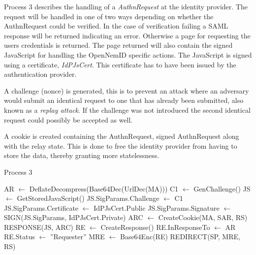\documentclass[twosided]{report}
\begin{document}
Process 3 describes the handling of a \emph{AuthnRequest} at the identity provider. The request will be handled in one of two ways depending on whether the AuthnRequest could be verified. In the case of verification failing a SAML response will be returned indicating an error. Otherwise a page for requesting the users credentials is returned. The page returned will also contain the signed JavaScript for handling the OpenNemID specific actions. The JavaScript is signed using a certificate, \emph{IdPJsCert}. This certificate has to have been issued by the authentication provider.
\par
A challenge (nonce) is generated, this is to prevent an attack where an adversary would submit an identical request to one that has already been submitted, also known as a \emph{replay attack}. If the challenge was not introduced the second identical request could possibly be accepted as well.
\par
A cookie is created containing the AuthnRequest, signed AuthnRequest along with the relay state. This is done to free the identity provider from having to store the data, thereby granting more statelessness.
\begin{algorithm}[H]
	\caption{Process 3}
	\begin{algorithmic}
		\STATE AR $\leftarrow$ DeflateDecompress(Base64Dec(UrlDec(MA)))
			\STATE C1 $\leftarrow$ GenChallenge()
			\STATE JS $\leftarrow$ GetStoredJavaScript()
			\STATE JS.SigParams.Challenge $\leftarrow$ C1
			\STATE JS.SigParams.Certificate $\leftarrow$ IdPJsCert.Public
			\STATE JS.SigParams.Signature $\leftarrow$ SIGN(JS.SigParams, IdPJsCert.Private)
			\STATE ARC $\leftarrow$ CreateCookie(MA, SAR, RS)
			\RETURN RESPONSE(JS, ARC)
		\ELSE
			\STATE RE $\leftarrow$ CreateResponse()
			\STATE RE.InResponseTo $\leftarrow$ AR
			\STATE RE.Status $\leftarrow$ ”Requester”
			\STATE MRE $\leftarrow$ Base64Enc(RE)
			\RETURN REDIRECT(SP, MRE, RS)
		\ENDIF
	\end{algorithmic}
\end{algorithm}
\end{document}
